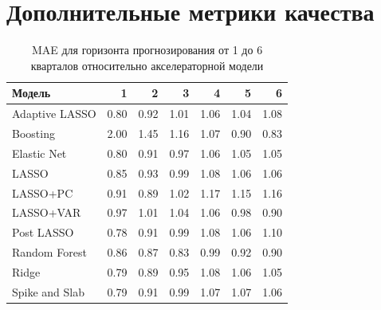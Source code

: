 \newpage

\renewcommand{\thechapter}{Приложение \Asbuk{chapter}}


\newpage

\tocless\chapter{Дополнительные метрики качества}

\label{app:list}


\renewcommand{\thechapter}{\Asbuk{chapter}}



\begin{table}[ht]
\centering
\caption{MAE для горизонта прогнозирования от 1 до 6 кварталов относительно акселераторной модели}
\begin{tabular}{lrrrrrr}
  \hline
Модель & 1 & 2 & 3 & 4 & 5 & 6 \\ 
  \hline
Adaptive LASSO & 0.80 & 0.92 & 1.01 & 1.06 & 1.04 & 1.08 \\ 
  Boosting & 2.00 & 1.45 & 1.16 & 1.07 & 0.90 & 0.83 \\ 
  Elastic Net & 0.80 & 0.91 & 0.97 & 1.06 & 1.05 & 1.05 \\ 
  LASSO & 0.85 & 0.93 & 0.99 & 1.08 & 1.06 & 1.06 \\ 
  LASSO+PC & 0.91 & 0.89 & 1.02 & 1.17 & 1.15 & 1.16 \\ 
  LASSO+VAR & 0.97 & 1.01 & 1.04 & 1.06 & 0.98 & 0.90 \\ 
  Post LASSO & 0.78 & 0.91 & 0.99 & 1.08 & 1.06 & 1.10 \\ 
  Random Forest & 0.86 & 0.87 & 0.83 & 0.99 & 0.92 & 0.90 \\ 
  Ridge & 0.79 & 0.89 & 0.95 & 1.08 & 1.06 & 1.05 \\ 
  Spike and Slab & 0.79 & 0.91 & 0.99 & 1.07 & 1.07 & 1.06 \\ 
   \hline
\end{tabular}
\end{table}



